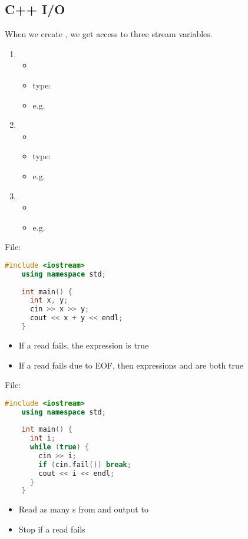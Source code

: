 \subsection{C++ I/O}

When we create , we get access to three stream variables.
\begin{enumerate}
      \item {}
            \begin{itemize}
                  \item {}
                  \item type: 
                  \item e.g. 
            \end{itemize}
      \item {}
            \begin{itemize}
                  \item {}
                  \item type: 
                  \item e.g. 
            \end{itemize}
      \item {}
            \begin{itemize}
                  \item {}
                  \item e.g. 
            \end{itemize}
\end{enumerate}

File: 
\begin{lstlisting}[language = C++]
    #include <iostream>
    using namespace std;
    
    int main() {
      int x, y;
      cin >> x >> y;
      cout << x + y << endl;
    }
\end{lstlisting}
\begin{itemize}
      \item If a read fails, the expression  is true
      \item If a read fails due to EOF, then expressions 
            and  are both true
\end{itemize}

File: 
\begin{lstlisting}[language = C++]
    #include <iostream>
    using namespace std;
    
    int main() {
      int i;
      while (true) {
        cin >> i;
        if (cin.fail()) break;
        cout << i << endl;
      }
    }
\end{lstlisting}
\begin{itemize}
      \item Read as many s from  and output to 
      \item Stop if a read fails
\end{itemize}

